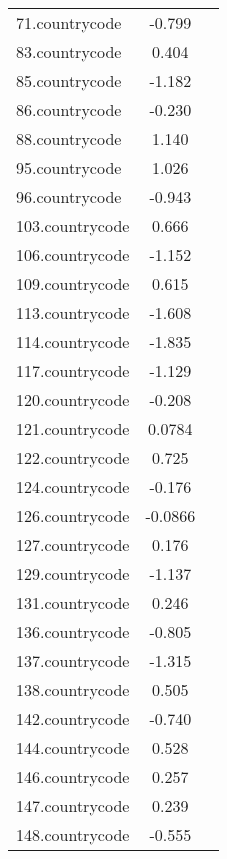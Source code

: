 {\begin{tabular}{l*{1}{cc}}
71.countrycode&      -0.799\sym{**} &            \\
83.countrycode&       0.404         &            \\
85.countrycode&      -1.182\sym{**} &            \\
86.countrycode&      -0.230         &            \\
88.countrycode&       1.140\sym{***}&            \\
95.countrycode&       1.026\sym{***}&            \\
96.countrycode&      -0.943\sym{***}&            \\
103.countrycode&       0.666\sym{*}  &            \\
106.countrycode&      -1.152\sym{***}&            \\
109.countrycode&       0.615\sym{*}  &            \\
113.countrycode&      -1.608\sym{***}&            \\
114.countrycode&      -1.835\sym{***}&            \\
117.countrycode&      -1.129\sym{***}&            \\
120.countrycode&      -0.208         &            \\
121.countrycode&      0.0784         &            \\
122.countrycode&       0.725\sym{**} &            \\
124.countrycode&      -0.176         &            \\
126.countrycode&     -0.0866         &            \\
127.countrycode&       0.176         &            \\
129.countrycode&      -1.137\sym{***}&            \\
131.countrycode&       0.246         &            \\
136.countrycode&      -0.805\sym{***}&            \\
137.countrycode&      -1.315\sym{***}&            \\
138.countrycode&       0.505         &            \\
142.countrycode&      -0.740\sym{**} &            \\
144.countrycode&       0.528         &            \\
146.countrycode&       0.257         &            \\
147.countrycode&       0.239         &            \\
148.countrycode&      -0.555         &            \\

\end{tabular}}
